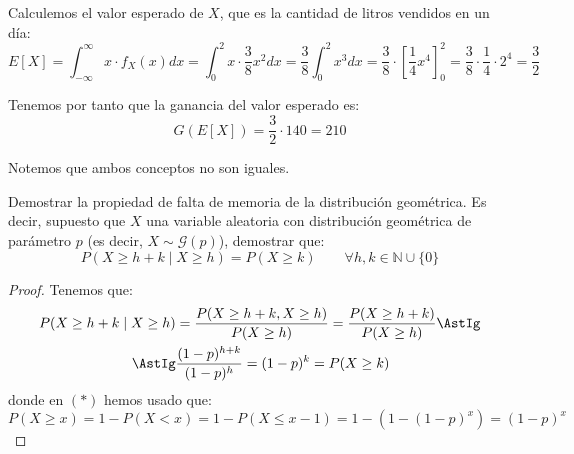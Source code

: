 \begin{ejercicio}
\begin{observacion}
        Calculemos el valor esperado de $X$, que es la cantidad de litros vendidos en un día:
        \begin{equation*}
            E[X] = \int_{-\infty}^{\infty}x\cdot f_X(x)dx = \int_{0}^{2}x\cdot \frac{3}{8}x^2dx = \frac{3}{8}\int_{0}^{2}x^3dx = \frac{3}{8}\cdot \left[\frac{1}{4}x^4\right]_{0}^{2} = \frac{3}{8}\cdot \frac{1}{4}\cdot 2^4 = \dfrac{3}{2}
        \end{equation*}

        Tenemos por tanto que la ganancia del valor esperado es:
        \begin{equation*}
            G(E[X]) = \dfrac{3}{2}\cdot 140 = 210
        \end{equation*}

        Notemos que ambos conceptos no son iguales.
    \end{observacion}
\end{ejercicio}


\begin{ejercicio}
    Demostrar la propiedad de falta de memoria de la distribución geométrica. Es decir, supuesto que $X$ una variable aleatoria con distribución geométrica de parámetro $p$ (es decir, $X \sim \mathcal{G}(p)$), demostrar que:
    \begin{equation*}
        P(X\geq h + k \mid X\geq h) = P(X\geq k) \qquad \forall h,k \in \mathbb{N}\cup \{0\}
    \end{equation*}
    \begin{proof}
        Tenemos que:
        \begin{align*}
            P(X\geq h + k \mid X\geq h) &= \frac{P(X\geq h+k, X\geq h)}{P(X\geq h)} = \frac{P(X\geq h+k)}{P(X\geq h)} \AstIg\\
            \AstIg & \dfrac{(1-p)^{h+k}}{(1-p)^h} = (1-p)^k = P(X\geq k)
        \end{align*}
        donde en $(\ast)$ hemos usado que:
        \begin{equation*}
            P(X\geq x) = 1-P(X<x) = 1-P(X\leq x-1) = 1-(1-(1-p)^x) = (1-p)^x
        \end{equation*}
    \end{proof}
\end{ejercicio}



